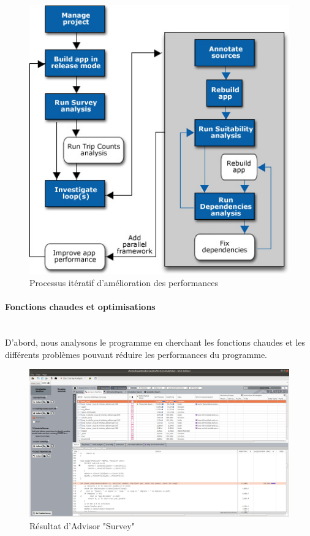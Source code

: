 \documentclass[
 aip,
 jmp,
 amsmath,amssymb,
 reprint
]{revtex4-1}
\begin{document}
\begin{figure}[H]
  \includegraphics[width=\linewidth, keepaspectratio=true]{Intel.jpg}
  \caption{Processus itératif d'amélioration des performances\label{Fig:intel_processes}}
\end{figure}

\paragraph{Fonctions chaudes et optimisations}\mbox{}\\
D'abord, nous analysons le programme en cherchant les fonctions chaudes et les différents problèmes pouvant réduire les performances du programme.\\

\begin{figure}[H]
  \includegraphics[width=\linewidth, keepaspectratio=true]{survey.png}
  \caption{Résultat d'Advisor "Survey"\label{Fig:advisor_survey}}
\end{figure}
\end{document}
